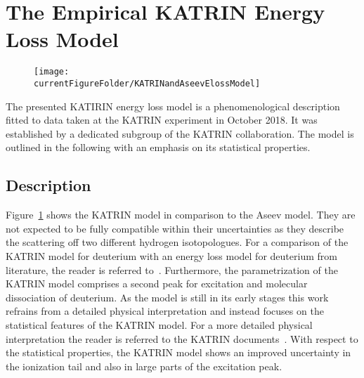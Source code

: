 \section{The Empirical KATRIN Energy Loss Model}
\label{sec:katrinElossModel}
\begin{figure}[h!]
	\centering
	\texttt{[image: \\currentFigureFolder/KATRINandAseevElossModel]}
	\label{fig:katrinElossElossModel}
\end{figure}
The presented KATIRIN energy loss model is a phenomenological description fitted to data taken at the KATRIN experiment in October 2018. It was established by a dedicated subgroup of the KATRIN collaboration. The model is outlined in the following with an emphasis on its statistical properties.

\subsection{Description}
Figure~\ref{fig:katrinElossElossModel} shows the KATRIN model in comparison to the Aseev model. They are not expected to be fully compatible within their uncertainties as they describe the scattering off two different hydrogen isotopologues. For a comparison of the KATRIN model for deuterium with an energy loss model for deuterium from literature, the reader is referred to~\cite{Rodenbeck2019}. Furthermore, the parametrization of the KATRIN model comprises a second peak for excitation and molecular dissociation of deuterium. As the model is still in its early stages this work refrains from a detailed physical interpretation and instead focuses on the statistical features of the KATRIN model. For a more detailed physical interpretation the reader is referred to the KATRIN documents~\cite{Rodenbeck2019,Hannen2019_1,Hannen2019_2}. With respect to the statistical properties, the KATRIN model shows an improved uncertainty in the ionization tail and also in large parts of the excitation peak.


